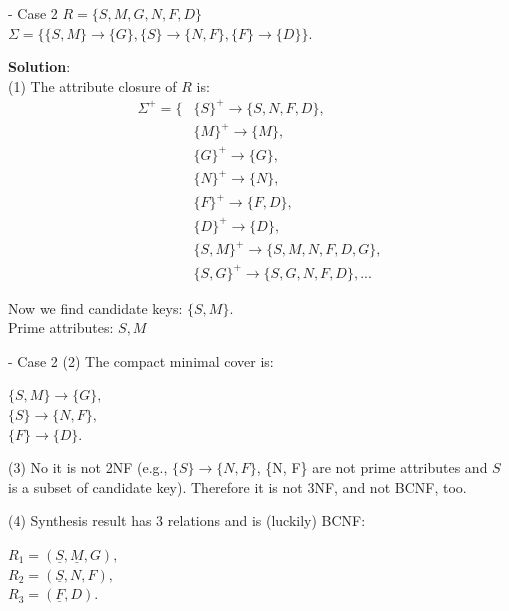 \begin{frame}[fragile]{ - Case 2}
	$R = \{S, M, G, N, F, D\}$\\
	$\Sigma = \{\{S, M\} \rightarrow \{G\}, 
	\{S\} \rightarrow \{N, F\},
	\{F\} \rightarrow \{D\}\}$.\\\vspace{5pt}
	
	\textbf{Solution}:\\
	(1) The attribute closure of $R$ is:
	\begin{align*} 
		\Sigma^{+} = \{&\{S\}^{+} \rightarrow \{S, N, F, D\},\\
		&\{M\}^{+} \rightarrow \{M\},\\
		&\{G\}^{+} \rightarrow \{G\},\\
		&\{N\}^{+} \rightarrow \{N\},\\
		&\{F\}^{+} \rightarrow \{F, D\},\\
		&\{D\}^{+} \rightarrow \{D\},\\
		&\{{S, M}\}^{+} \rightarrow \{S, M, N, F, D, G\},\\
		&\{{S, G}\}^{+} \rightarrow \{S, G, N, F, D\}, ...
	\end{align*} 
	
	Now we find candidate keys: $\{S, M\}$.\\
	Prime attributes: $S, M$
\end{frame}

\begin{frame}[fragile]{ - Case 2}
	(2) The compact minimal cover is:\\\vspace{5pt}
	
	$\{S, M\} \rightarrow \{G\},$\\
	$\{S\}  \rightarrow \{N, F\},$\\
	$\{F\} \rightarrow \{D\}.$\\\vspace{5pt}
	
	(3)  No it is not 2NF (e.g., $\{S\}\rightarrow\{N, F\}$, \{N, F\} are not prime attributes and $S$ is a subset of candidate key). Therefore it is not 3NF, and not BCNF, too.\\\vspace{5pt}
	
	(4) Synthesis result has 3 relations and is (luckily) BCNF: \\\vspace{5pt}
	
	$R_1 = (\underline{S}, \underline{M}, G),$\\
	$R_2 = (\underline{S}, N, F),$\\
	$R_3 = (\underline{F}, D).$\\\vspace{5pt}
	
\end{frame}

